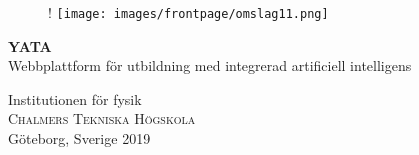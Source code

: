 
\begin{titlepage}
			
\addtolength{\voffset}{2cm}

\begin{figure}[H]
    \centering
    \vspace{2cm}	%
     {!} {
         \texttt{[image: images/frontpage/omslag11.png]}
    }
\end{figure}

\mbox{}
\vfill
\renewcommand{\familydefault}{\sfdefault} \normalfont %
\noindent\textbf{{\Huge     YATA}} 	\\[0.5cm]
{\Large Webbplattform för utbildning med integrerad artificiell intelligens \setlength{\parskip}{1cm}}

 \setlength{\parskip}{2.9cm}

\noindent Institutionen för fysik \\
\textsc{Chalmers Tekniska Högskola} \\
Göteborg, Sverige 2019

\renewcommand{\familydefault}{\rmdefault} \normalfont %
\end{titlepage}




